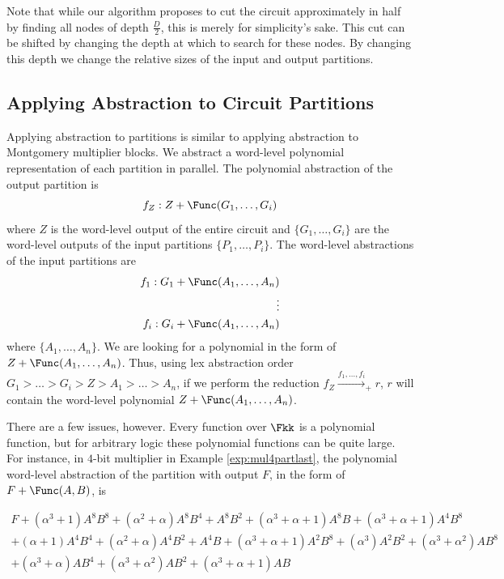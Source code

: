 Note that while our algorithm proposes to cut the circuit approximately in 
half by finding all nodes of depth $\frac{D}{2}$, this is merely for 
simplicity's sake. This cut can be shifted by changing the depth at which
to search for these nodes. By changing this depth we change the 
relative sizes of the input and output partitions.

\subsection{Applying Abstraction to Circuit Partitions}

Applying abstraction to partitions is similar to applying abstraction to
Montgomery multiplier blocks. We abstract a word-level polynomial 
representation of each partition in parallel. The polynomial abstraction
of the output partition is
\begin{equation}
f_Z: Z + \Func(G_1,\dots,G_i) \nonumber
\end{equation}
where $Z$ is the word-level output of the entire circuit and 
$\{G_1,\dots,G_i\}$ are the word-level outputs of the input partitions
$\{P_1,\dots,P_i\}$. The word-level abstractions of the input partitions are
\begin{eqnarray}
f_1: G_1 + \Func(A_1,\dots,A_n) \nonumber \\
\vdots \\
f_i: G_i + \Func(A_1,\dots,A_n) \nonumber
\end{eqnarray}
where $\{A_1,\dots,A_n\}$.
We are looking for a polynomial in the form of $Z+\Func(A_1,\dots,A_n)$.
Thus, using lex abstraction order $G_1>\dots>G_i>Z>A_1>\dots>A_n$, if we 
perform the reduction $f_Z\stackrel{f_1,\dots,f_i}{\longrightarrow}_+ r$,
$r$ will contain the word-level polynomial $Z+\Func(A_1,\dots,A_n)$.

There are a few issues, however. Every function over $\Fkk$ is a polynomial
function, but for arbitrary logic these polynomial functions can be quite
large. For instance, in $4$-bit multiplier in Example \ref{exp:mul4partlast},
the polynomial word-level abstraction of the partition with output $F$, 
in the form of $F+\Func(A,B)$, is

\begin{eqnarray}
F+(\alpha^3+1)A^8 B^8+(\alpha^2+\alpha)A^8 B^4+A^8 B^2+(\alpha^3+\alpha+1) A^8 B+(\alpha^3+\alpha+1) A^4 B^8 \nonumber \\
+(\alpha+1) A^4 B^4+(\alpha^2+\alpha) A^4 B^2+A^4 B+(\alpha^3+\alpha+1) A^2 B^8+(\alpha^3) A^2 B^2+(\alpha^3+\alpha^2) A B^8 \nonumber \\
+(\alpha^3+\alpha) A B^4+(\alpha^3+\alpha^2) A B^2+(\alpha^3+\alpha+1) A B \nonumber 
\end{eqnarray}

